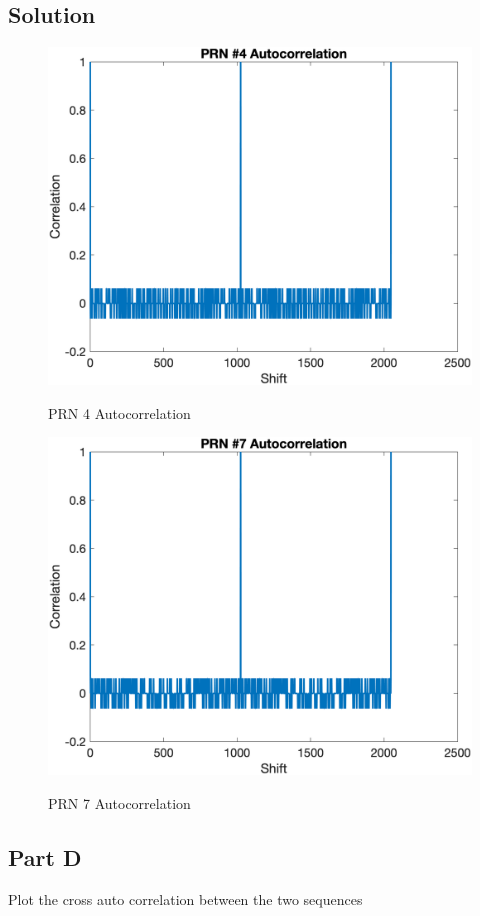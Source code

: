 \documentclass{article}
\begin{document}
\subsection*{Solution}
\begin{figure}[H]
    \centering
    \includegraphics[width=0.75\linewidth]{../figures/p8_prn4_acorr.png}\label{p8_prn4_acorr}
    \caption{PRN 4 Autocorrelation}
\end{figure}
\begin{figure}[H]
    \centering
    \includegraphics[width=0.75\linewidth]{../figures/p8_prn7_acorr.png}\label{p8_prn7_acorr}
    \caption{PRN 7 Autocorrelation}
\end{figure}

\subsection*{Part D}
Plot the cross auto correlation between the two sequences
\end{document}
